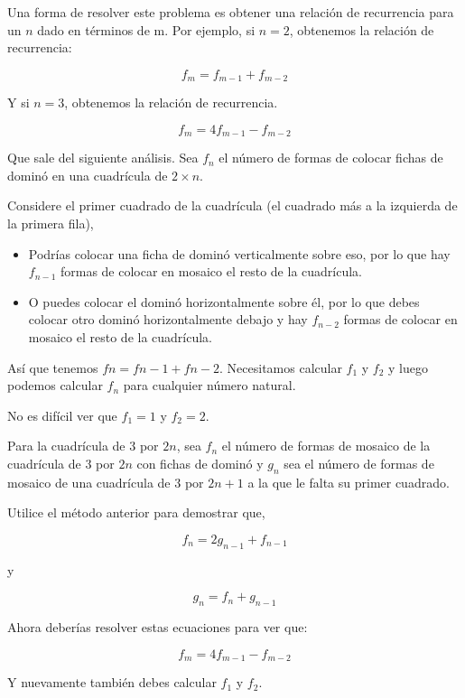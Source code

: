Una forma de resolver este problema es obtener una relación de recurrencia para un $n$ dado en términos de m. Por ejemplo, si $n=2$, obtenemos la relación de recurrencia:

$$f_{m} = f_{m-1} + f_{m-2}$$

Y si $n=3$, obtenemos la relación de recurrencia.

$$f_{m} = 4f_{m-1} - f_{m-2}$$

Que sale del siguiente análisis. Sea $f_n$ el número de formas de colocar fichas de dominó en una cuadrícula de $2 \times n$.

Considere el primer cuadrado de la cuadrícula (el cuadrado más a la izquierda de la primera fila),

\begin{itemize}
	\item Podrías colocar una ficha de dominó verticalmente sobre eso, por lo que hay $f_{n-1}$ formas de 
	colocar en mosaico el resto de la cuadrícula.
	\item O puedes colocar el dominó horizontalmente sobre él, por lo que debes colocar otro dominó 
	horizontalmente debajo y hay $f_{n-2}$ formas de colocar en mosaico el resto de la cuadrícula.
\end{itemize}

Así que tenemos $f{n}=f{n-1}+f{n-2}$. Necesitamos calcular $f_1$ y $f_2$ y luego podemos calcular $f_n$ para cualquier número natural.

No es difícil ver que $f_1=1$ y $f_2=2$.

Para la cuadrícula de $3$ por $2n$, sea $f_n$ el número de formas de mosaico de la cuadrícula de $3$ por $2n$ con fichas de dominó y $g_n$ sea el número de formas de mosaico de una cuadrícula de $3$ por $2n+1$ a la que le falta su primer cuadrado.

Utilice el método anterior para demostrar que,

$$f_n=2g_{n-1}+f_{n-1}$$

y

$$g_n=f_n+g_{n-1}$$

Ahora deberías resolver estas ecuaciones para ver que:

$$f_{m} = 4f_{m-1} - f_{m-2}$$

Y nuevamente también debes calcular $f_1$ y $f_2$.

